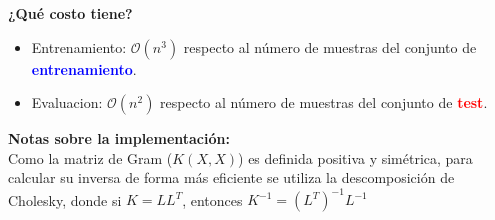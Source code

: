 {\begin{minipage}{\linewidth}
\textbf{¿Qué costo tiene?} 
\begin{itemize}
	\item Entrenamiento: $\mathcal{O}(n^3)$ respecto al número de muestras del conjunto de \textcolor{blue}{\textbf{entrenamiento}}.
	\item Evaluacion: $\mathcal{O}(n^2)$ respecto al número de muestras del conjunto de \textcolor{red}{\textbf{test}}.
\end{itemize}

\textbf{Notas sobre la implementación:}\\
Como la matriz de Gram ($K(X,X)$) es definida positiva y simétrica, para calcular su inversa de forma más eficiente se utiliza la descomposición de Cholesky, donde si $K=LL^T$, entonces $K^{-1}=(L^T)^{-1}L^{-1}$


\end{minipage}}